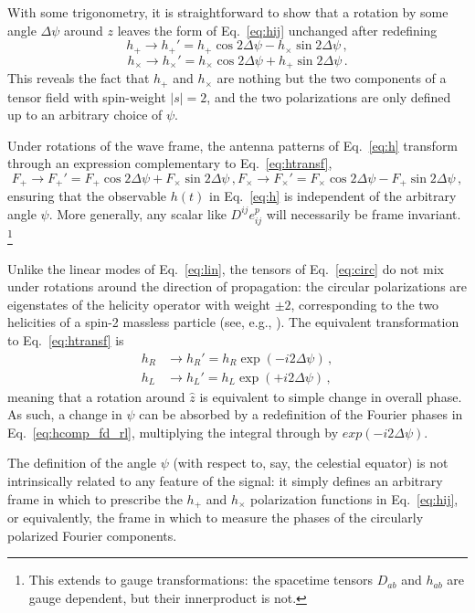\documentclass[aps,prd,twocolumn,superscriptaddress,preprintnumbers,floatfix,nofootinbib]{revtex4-2}
\newcommand{\beq}{\begin{equation}}
\newcommand{\eeq}{\end{equation}}
\newcommand*{\eq}[1]{Eq.~\eqref{eq:#1}}
\begin{document}
With some trigonometry, it is straightforward to show that a rotation by some angle $\Delta \psi$ around $z$ leaves the form of \eq{hij} unchanged after redefining
\beq \label{eq:htransf}
h_+ \rightarrow h_+' = h_+ \cos 2\Delta \psi - h_\times \sin 2\Delta\psi \, ,
\eeq
\beq
h_\times \rightarrow h_\times' = h_\times \cos 2\Delta \psi + h_+ \sin 2\Delta\psi \, .
\eeq
This reveals the fact that $h_+$ and $h_\times$ are nothing but the two components of a tensor field with spin-weight $|s|=2$, and the two polarizations are only defined up to an arbitrary choice of $\psi$.

Under rotations of the wave frame, the antenna patterns of \eq{h} transform through an expression complementary to \eq{htransf},
\begin{subequations} \label{eq:Ftransf}
\beq
F_+ \rightarrow F_+' = F_+ \cos 2\Delta \psi + F_\times \sin 2\Delta\psi \, ,
\eeq
\beq
F_\times \rightarrow F_\times' = F_\times \cos 2\Delta \psi - F_+ \sin 2\Delta\psi \, ,
\eeq
\end{subequations}
ensuring that the observable $h(t)$ in \eq{h} is independent of the arbitrary angle $\psi$.
More generally, any scalar like $D^{ij} e^{p}_{ij}$ will necessarily be frame invariant.%
\footnote{This extends to gauge transformations: the spacetime tensors $D_{ab}$ and $h_{ab}$ are gauge dependent, but their innerproduct is not.}

Unlike the linear modes of Eq.~\eqref{eq:lin}, the tensors of Eq.~\eqref{eq:circ} do not mix under rotations around the direction of propagation:
the circular polarizations are eigenstates of the helicity operator with weight $\pm 2$, corresponding to the two helicities of a spin-2 massless particle (see, e.g., \cite{Hinterbichler2011}).
The equivalent transformation to Eq.~\eqref{eq:htransf} is
\begin{subequations} \label{eq:htransf_circ}
\begin{align}
h_R &\rightarrow h_R' = h_R \exp(- i2  \Delta \psi) \, ,\\
h_L &\rightarrow h_L' = h_L \exp(+ i2  \Delta \psi)\, ,
\end{align}
\end{subequations}
meaning that a rotation around $\hat{z}$ is equivalent to simple change in overall phase.
As such, a change in $\psi$ can be absorbed by a redefinition of the Fourier phases in \eq{hcomp_fd_rl}, multiplying the integral through by $exp(-i2\Delta\psi)$.

The definition of the angle $\psi$ (with respect to, say, the celestial equator) is not intrinsically related to any feature of the signal: it simply defines an arbitrary frame in which to prescribe the $h_+$ and $h_\times$ polarization functions in \eq{hij}, or equivalently, the frame in which to measure the phases of the circularly polarized Fourier components.
\end{document}
